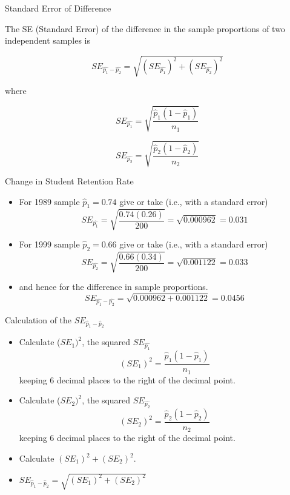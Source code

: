 \documentclass[14pt]{beamer}\usepackage[]{graphicx}\usepackage[]{color}
\begin{document}
\begin{frame}[fragile]{Standard Error of Difference}

The SE (Standard Error) of the difference in the sample proportions of  two independent samples is

$$SE_{\hat{p_1} - \hat{p_2}} = \sqrt{ (SE_{\hat{p_1}})^2 + (SE_{\hat{p_2}})^2} $$

where

{\small{
$$ SE_{\hat{p_1}} = \sqrt{ \frac{ \hat{p}_1 ( 1 - \hat{p}_1)}{n_1}} $$

$$ SE_{\hat{p_2}} = \sqrt{ \frac{ \hat{p}_2 ( 1 - \hat{p}_2)}{n_2}} $$
}}
\end{frame}

\begin{frame}[fragile]{Change in Student Retention Rate}

{\footnotesize{
\begin{itemize}
\item<1-> For 1989 sample $\hat{p}_1 = 0.74$ give or take (i.e., with a standard error)
$$ SE_{\hat{p_1}} = \sqrt{ \frac{ 0.74 ( 0.26)}{200}} = \sqrt{0.000962} = 0.031 $$

\item<2-> For 1999 sample $\hat{p}_2 = 0.66$ give or take (i.e., with a standard error)
$$ SE_{\hat{p_2}} = \sqrt{ \frac{ 0.66 ( 0.34)}{200}} = \sqrt{0.001122} = 0.033 $$

\item<3-> and hence for the difference in sample proportions.
$$SE_{\hat{p_1} - \hat{p_2}} = \sqrt{ 0.000962 + 0.001122} = 0.0456 $$

\end{itemize}
}}
\end{frame}

\begin{frame}[fragile]{Calculation of the $SE_{\hat{p}_1 - \hat{p}_2}$}

{\footnotesize{
\begin{itemize}
\item<1-> Calculate ($SE_1)^2$, the squared $SE_{\hat{p_1}}$
\begin{equation*}
  (SE_1)^2 =  \frac{ \hat{p}_1 (1 - \hat{p}_1)}{n_1}
\end{equation*}
keeping 6 decimal places to the right of the decimal point.  
\item<2-> Calculate ($SE_2)^2$, the squared $SE_{\hat{p_2}}$
\begin{equation*}
  (SE_2)^2 = \frac{ \hat{p}_2 (1 - \hat{p}_2)}{n_2} 
\end{equation*}
keeping 6 decimal places to the right of the decimal point.  
\item<3-> Calculate $(SE_1)^2 + (SE_2)^2$.
\item<4-> $SE_{\hat{p}_1 - \hat{p}_2} = \sqrt{(SE_1)^2 + (SE_2)^2}$

\end{itemize}
}}
\end{frame}
\end{document}
